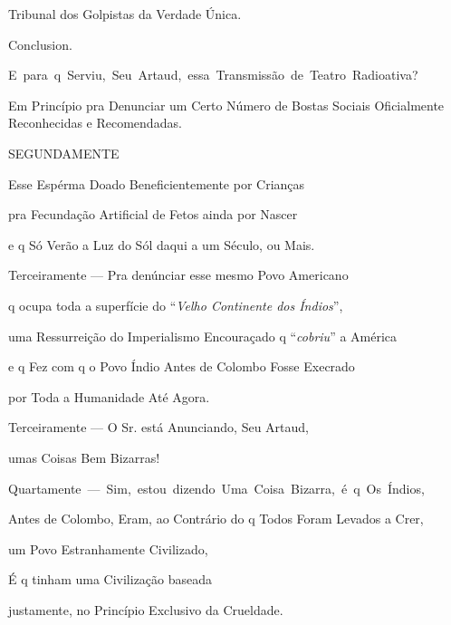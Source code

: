 

Tribunal dos Golpistas da Verdade Única.

Conclusion.


\mbox{E para q Serviu, Seu Artaud, essa Transmissão de Teatro Radioativa?}



Em Princípio pra Denunciar um Certo Número
de Bostas Sociais Oficialmente Reconhecidas e Recomendadas.




SEGUNDAMENTE

Esse Espérma Doado Beneficientemente por Crianças

pra Fecundação Artificial de Fetos ainda por Nascer

e q Só Verão a Luz do Sól daqui a um Século, ou Mais.


Terceiramente --- Pra denúnciar esse mesmo Povo Americano

q ocupa toda a superfície do ``\emph{Velho Continente dos Índios}'',

uma Ressurreição do Imperialismo Encouraçado q ``\emph{cobriu}'' a América

e q Fez com q o Povo Índio Antes de Colombo Fosse Execrado

por Toda a Humanidade Até Agora.


Terceiramente --- O Sr. está Anunciando, Seu Artaud,

umas Coisas Bem Bizarras!


\mbox{Quartamente --- Sim, estou dizendo Uma Coisa Bizarra, é q Os Índios,}

Antes de Colombo, Eram, ao Contrário do q Todos Foram Levados a Crer,

um Povo Estranhamente Civilizado,

É q tinham uma Civilização baseada

justamente, no Princípio Exclusivo da Crueldade.

